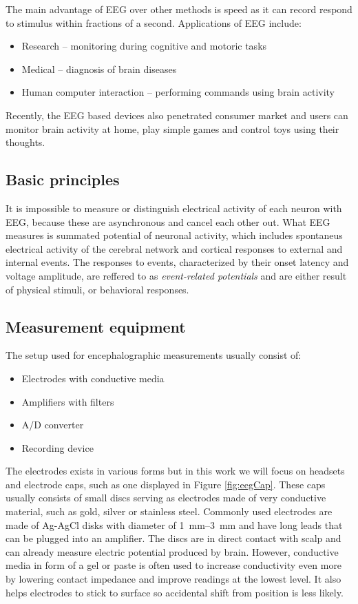 The main advantage of EEG over other methods is speed as it can record respond
to stimulus within fractions of a second. \cite{eegFund} Applications of EEG
include:
\begin{itemize}
  \item Research -- monitoring during cognitive and motoric tasks
  \item Medical -- diagnosis of brain diseases
  \item Human computer interaction -- performing commands using brain activity  
\end{itemize}
Recently, the EEG based devices also penetrated consumer market and users can
monitor brain activity at home, play simple games and control toys using
their thoughts. 

\subsection{Basic principles}
It is impossible to measure or distinguish electrical activity of each neuron
with EEG, because these are asynchronous and cancel each other out. 
What EEG measures is summated potential of neuronal activity, which includes
spontaneus electrical activity of the cerebral network and cortical responses to
external and internal events. The responses to events, characterized by their
onset latency and voltage amplitude, are reffered to as \emph{event-related
potentials} and are either result of physical stimuli, or behavioral responses.
\cite{bcComm}


\subsection{Measurement equipment}
The setup used for encephalographic measurements usually consist of: 
\begin{itemize}
  \item Electrodes with conductive media
  \item Amplifiers with filters
  \item A/D converter
  \item Recording device
\end{itemize}
The electrodes exists in various forms but in this work we will focus on
headsets and electrode caps, such as one displayed in Figure \ref{fig:eegCap}.
These caps usually consists of small discs serving as electrodes made
of very conductive material, such as gold, silver or stainless steel. Commonly
used electrodes are made of Ag-AgCl disks with diameter of \SIrange[range-units
= single]{1}{3}{\mm} and have long leads that can be plugged into an
amplifier. \cite{eegFund} The discs are in direct contact with scalp and can already
measure electric potential produced by brain. However, conductive media in form of a
gel or paste is often used to increase conductivity even more by lowering
contact impedance and improve readings at the lowest level. It also helps
electrodes to stick to surface so accidental shift from position is less likely.

